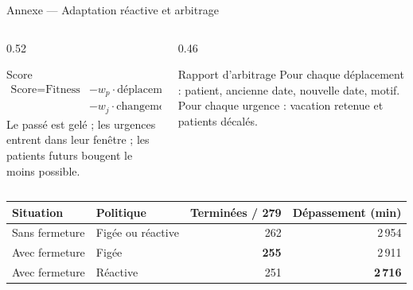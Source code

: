 \begin{frame}{Annexe --- Adaptation réactive et arbitrage}
  \scriptsize
  \begin{columns}[T,onlytextwidth]
    \begin{column}{0.52\textwidth}
      \begin{block}{Score}
        \[
          \begin{aligned}
            \text{Score} = \text{Fitness}
            &- w_p \cdot \text{déplacements}\\
            &- w_j \cdot \text{changements de jour}
          \end{aligned}
        \]
        Le passé est gelé ; les urgences entrent dans leur fenêtre ; les
        patients futurs bougent le moins possible.
      \end{block}
    \end{column}
    \begin{column}{0.46\textwidth}
      \begin{exampleblock}{Rapport d'arbitrage}
        \footnotesize Pour chaque déplacement : patient, ancienne date,
        nouvelle date, motif. Pour chaque urgence : vacation retenue et
        patients décalés.
      \end{exampleblock}
    \end{column}
  \end{columns}

  \vspace{0.15cm}
  \centering
  \renewcommand{\arraystretch}{1.18}
  \begin{tabular}{llrr}
    \toprule
    Situation & Politique & Terminées / 279 & Dépassement (min) \\
    \midrule
    Sans fermeture & Figée ou réactive & 262 & 2\,954 \\
    Avec fermeture & Figée & \textbf{255} & 2\,911 \\
    Avec fermeture & Réactive & 251 & \textbf{2\,716} \\
    \bottomrule
  \end{tabular}
\end{frame}

